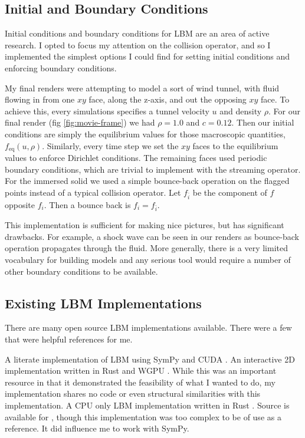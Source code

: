 \subsection{Initial and Boundary Conditions}\label{sec:ic-and-bc}

Initial conditions and boundary conditions for LBM
are an area of active research.
I opted to focus my attention on the collision operator,
and so I implemented the simplest options I could find 
for setting initial conditions and enforcing boundary conditions.

My final renders were attempting to model a sort of wind tunnel,
with fluid flowing in from one $xy$ face, along the z-axis, 
and out the opposing $xy$ face.
To achieve this, every simulations specifies a tunnel velocity 
$u$ and density $\rho$.
For our final render (fig \ref{fig:movie-frame})
we had $\rho = 1.0$ and $c = 0.12$.
Then our initial conditions are simply 
the equilibrium values for those macroscopic quantities,
$f_{\text{eq}}(u, \rho)$.
Similarly, every time step we set the
$xy$ faces to the equilibrium values to enforce Dirichlet conditions.
The remaining faces used periodic boundary conditions, which
are trivial to implement with the streaming operator.
For the immersed solid we used a simple bounce-back 
operation \cite{Kruger2018} on the flagged points
instead of a typical collision operator.
Let $f_{\bar{i}}$ be the component of $f$ opposite $f_i$.
Then a bounce back is $f_i = f_{\bar{i}}$.

This implementation is sufficient for making nice pictures, 
but has significant drawbacks.
For example, a shock wave can be seen in our renders
as bounce-back operation propagates through the fluid.
More generally, there is a very limited vocabulary for building
models and any serious tool would require a number of
other boundary conditions to be available.

\subsection{Existing LBM Implementations}

There are many open source LBM implementations available.
There were a few that were helpful references for me.
\begin{outline}
  \1 A literate implementation of LBM using SymPy and CUDA \cite{web:literate_lbm}.
  \1 An interactive 2D implementation written in Rust and WGPU \cite{web:lbm-web}.
  \2 While this was an important resource in that it demonstrated 
  the feasibility of what I wanted to do, 
  my implementation shares no code or even structural similarities 
  with this implementation.
  \1 A CPU only LBM implementation written in Rust \cite{web:lbm-rs}.
  \1 Source is available for \cite{Hennig2023}, though this implementation was too complex to be of use as a reference. 
  It did influence me to work with SymPy.
\end{outline}
